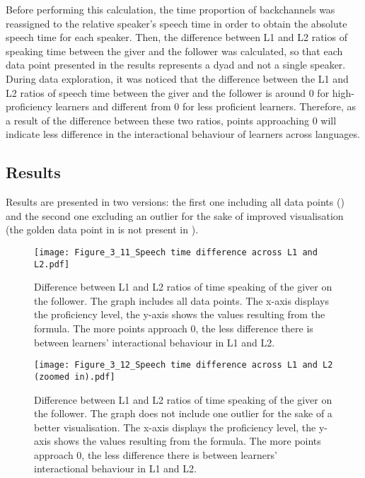 Before performing this calculation, the time proportion of backchannels was reassigned to the relative speaker’s speech time in order to obtain the absolute speech time for each speaker. Then, the difference between L1 and L2 ratios of speaking time between the giver and the follower was calculated, so that each data point presented in the results represents a dyad and not a single speaker. During data exploration, it was noticed that the difference between the L1 and L2 ratios of speech time between the giver and the follower is around 0 for high-proficiency learners and different from 0 for less proficient learners. Therefore, as a result of the difference between these two ratios, points approaching 0 will indicate less difference in the interactional behaviour of learners across languages.

\subsection{Results}
\label{sec:3.4.2}
Results are presented in two versions: the first one including all data points () and the second one excluding an outlier for the sake of improved visualisation (the golden data point in  is not present in ).

\begin{figure}
\texttt{[image: Figure\_3\_11\_Speech time difference across L1 and L2.pdf]}
\caption{Difference between L1 and L2 ratios of time speaking of the giver on the follower. The graph includes all data points. The x-axis displays the proficiency level, the y-axis shows the values resulting from the formula. The more points approach 0, the less difference there is between learners’ interactional behaviour in L1 and L2.}
\label{fig:3.11}
\end{figure}

\begin{figure}
\texttt{[image: Figure\_3\_12\_Speech time difference across L1 and L2 (zoomed in).pdf]}
\caption{Difference between L1 and L2 ratios of time speaking of the giver on the follower. The graph does not include one outlier for the sake of a better visualisation. The x-axis displays the proficiency level, the y-axis shows the values resulting from the formula. The more points approach 0, the less difference there is between learners’ interactional behaviour in L1 and L2.}
\label{fig:3.12}
\end{figure}


